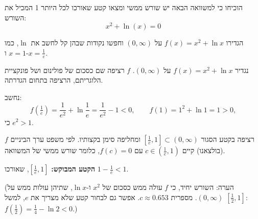 
\begin{question}
הוכיחו כי למשוואה הבאה יש שורש ממשי ומצאו קטע שאורכו לכל היותר 1 המכיל את השורש:
\[
x^2+\ln(x)=0
\]
\end{question}

\begin{hint}
הגדירו $f(x)=x^2+\ln x$ על $(0,\infty)$ וחפשו נקודות שבהן קל לחשב את $\ln$, כמו $x=1$ ו-$x=\frac1e$.
\end{hint}

\begin{solution}
נגדיר $f(x)=x^2+\ln x$ על $(0,\infty)$. $f$ רציפה שם כסכום של פולינום ושל פונקציית הלוגריתם, הרציפה בתחום הגדרתה.

נחשב:
\[
f\!\left(\tfrac1e\right)=\frac1{e^2}+\ln\frac1e=\frac{1}{e^2}-1<0,\qquad f(1)=1^2+\ln1=1>0 ,
\]
כי $e^2>1$.

$f$ רציפה בקטע הסגור $\left[\frac1e,1\right]\subset(0,\infty)$ ומחליפה סימן בקצותיו. לפי משפט ערך הביניים (בולצאנו) קיים $c\in\left(\frac1e,1\right)$ עם $f(c)=0$, כלומר שורש ממשי של המשוואה.

\textbf{הקטע המבוקש:} $\left[\frac1e,1\right]$, שאורכו $1-\frac1e<1$.

(הערה: השורש יחיד, כי $f$ עולה ממש כסכום של $x^2$ ו-$\ln x$, שתיהן עולות ממש על $(0,\infty)$. מספרית $c\approx0.653$. אפשר גם לבחור קטע שלא מצריך את $e$, למשל $\left[\frac12,1\right]$: $f(\frac12)=\frac14-\ln2<0$.)
\end{solution}
